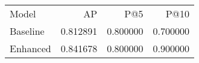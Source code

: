 \begin{tabular}{lrrr}
Model & AP & P@5 & P@10 \\
Baseline & 0.812891 & 0.800000 & 0.700000 \\
Enhanced & 0.841678 & 0.800000 & 0.900000 \\
\end{tabular}
